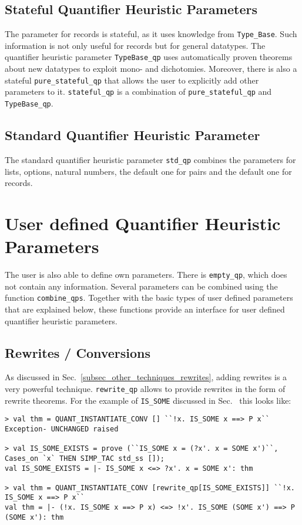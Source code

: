 \documentclass[a4paper,12pt,DIV=12,oneside]{scrbook}
\theoremstyle{definition}
\theoremstyle{remark}
\begin{document}
\subsection{Stateful Quantifier Heuristic Parameters}

The parameter for records is stateful, as it uses knowledge from
\texttt{Type\_Base}. Such information is not only useful for records
but for general datatypes. The quantifier heuristic parameter
\texttt{TypeBase\_qp} uses automatically proven theorems about new
datatypes to exploit mono- and dichotomies. Moreover, there is also a
stateful \texttt{pure\_stateful\_qp} that allows the user to
explicitly add other parameters to it.  \texttt{stateful\_qp} is a
combination of \texttt{pure\_stateful\_qp} and \texttt{TypeBase\_qp}.

\subsection{Standard Quantifier Heuristic Parameter}

The standard quantifier heuristic parameter \texttt{std\_qp} combines
the parameters for lists, options, natural numbers, the default one
for pairs and the default one for records.


\section{User defined Quantifier Heuristic Parameters}\label{sec_qps_user}

The user is also able to define own parameters. There
is \texttt{empty\_qp}, which does not contain any information. Several
parameters can be combined using the function
\texttt{combine\_qps}. Together with the basic types of user defined
parameters that are explained below, these functions provide an
interface for user defined quantifier heuristic parameters.

\subsection{Rewrites / Conversions}

As discussed in Sec.~\ref{subsec_other_techniques_rewrites}, adding 
rewrites is a very powerful technique. \texttt{rewrite\_qp} allows to provide rewrites in the form of rewrite theorems.
For the example of \texttt{IS\_SOME} discussed in Sec.~\label{subsec_other_techniques_rewrites} this
looks like:

{\scriptsize
\begin{verbatim}
> val thm = QUANT_INSTANTIATE_CONV [] ``!x. IS_SOME x ==> P x`` 
Exception- UNCHANGED raised

> val IS_SOME_EXISTS = prove (``IS_SOME x = (?x'. x = SOME x')``, Cases_on `x` THEN SIMP_TAC std_ss []);
val IS_SOME_EXISTS = |- IS_SOME x <=> ?x'. x = SOME x': thm

> val thm = QUANT_INSTANTIATE_CONV [rewrite_qp[IS_SOME_EXISTS]] ``!x. IS_SOME x ==> P x`` 
val thm = |- (!x. IS_SOME x ==> P x) <=> !x'. IS_SOME (SOME x') ==> P (SOME x'): thm
\end{verbatim}}
\end{document}

